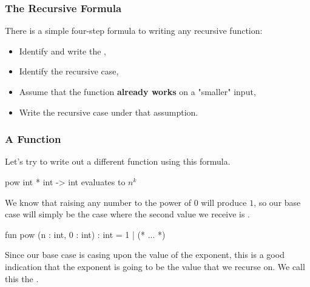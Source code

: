 \documentclass[aspectratio=169]{beamer}
\begin{document}
\begin{frame}[fragile]
  \frametitle{The Recursive Formula}

  There is a simple four-step formula to writing any recursive function:

  \pause
  \vspace{5pt}

  \begin{itemize}
    \item Identify and write the , \pause
    \item Identify the recursive case, \pause
    \item Assume that the function \textbf{already works} on a "smaller" input, \pause
    \item Write the recursive case under that assumption.
  \end{itemize}

  \pause
  \vspace{\fill}

\end{frame}

\begin{frame}[fragile]
  \frametitle{A  Function}

  Let's try to write out a different function using this formula.

  \spec
    {pow}
    {int * int -> int}
    {}
    { evaluates to $n^k$}

  \pause
  \vspace{\fill}

  We know that raising any number to the power of $0$ will produce $1$, so
  our base case will simply be the case where the second value we receive is
  .

  \pause
  \begin{codeblock}
    fun pow (n : int, 0 : int) : int = 1
      | (* ... *)
  \end{codeblock}

  \pause
  \vspace{\fill}

  Since our base case is casing upon the value of the exponent, this is a good
  indication that the exponent is going to be the value that we recurse on. We
  call this the .
\end{frame}
\end{document}

